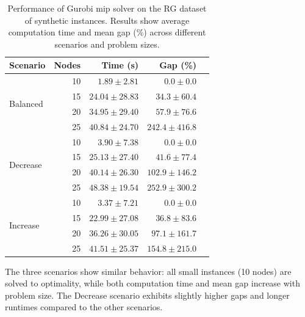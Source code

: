 \documentclass[twocolumn]{article} %
\begin{document}
\begin{table}[h]
    \caption{Performance of Gurobi \gls{mip} solver on the RG dataset of synthetic instances. Results show average computation time and mean gap (\%) across different scenarios and problem sizes.}
    \label{tab:gurobi_performance}
    \centering
    \begin{tabular}{lrrrr}
        \toprule
        \textbf{Scenario} & \textbf{Nodes} & \textbf{Time (s)} & \textbf{Gap (\%)} \\
        \midrule
        \multirow{4}{*}{Balanced} & 10 & $1.89 \pm 2.81$ & $0.0 \pm 0.0$ \\
        & 15 & $24.04 \pm 28.83$ & $34.3 \pm 60.4$ \\
        & 20 & $34.95 \pm 29.40$ & $57.9 \pm 76.6$ \\
        & 25 & $40.84 \pm 24.70$ & $242.4 \pm 416.8$ \\
        \midrule
        \multirow{4}{*}{Decrease} & 10 & $3.90 \pm 7.38$ & $0.0 \pm 0.0$ \\
        & 15 & $25.13 \pm 27.40$ & $41.6 \pm 77.4$ \\
        & 20 & $40.14 \pm 26.30$ & $102.9 \pm 146.2$ \\
        & 25 & $48.38 \pm 19.54$ & $252.9 \pm 300.2$ \\
        \midrule
        \multirow{4}{*}{Increase} & 10 & $3.37 \pm 7.21$ & $0.0 \pm 0.0$ \\
        & 15 & $22.99 \pm 27.08$ & $36.8 \pm 83.6$ \\
        & 20 & $36.26 \pm 30.05$ & $97.1 \pm 161.7$ \\
        & 25 & $41.51 \pm 25.37$ & $154.8 \pm 215.0$ \\
        \bottomrule
    \end{tabular}
\end{table}

The three scenarios show similar behavior: all small instances (10 nodes) are solved to optimality, while both computation time and mean gap increase with problem size.
The Decrease scenario exhibits slightly higher gaps and longer runtimes compared to the other scenarios.
\end{document}

